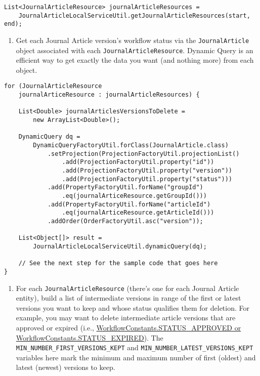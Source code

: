 \begin{enumerate}
\begin{verbatim}
List<JournalArticleResource> journalArticleResources = 
    JournalArticleLocalServiceUtil.getJournalArticleResources(start, end);
\end{verbatim}

  \begin{enumerate}
  \def\labelenumii{\arabic{enumii}.}
  \setcounter{enumii}{1}
  \item
    Get each Journal Article version's workflow status via the
    \texttt{JournalArticle} object associated with each
    \texttt{JournalArticleResource}. Dynamic Query is an efficient way
    to get exactly the data you want (and nothing more) from each
    object.
  \end{enumerate}

\begin{verbatim}
for (JournalArticleResource
    journalArticeResource : journalArticleResources) {

    List<Double> journalArticlesVersionsToDelete =
        new ArrayList<Double>();

    DynamicQuery dq =
        DynamicQueryFactoryUtil.forClass(JournalArticle.class)
            .setProjection(ProjectionFactoryUtil.projectionList()
                .add(ProjectionFactoryUtil.property("id"))
                .add(ProjectionFactoryUtil.property("version"))
                .add(ProjectionFactoryUtil.property("status")))
            .add(PropertyFactoryUtil.forName("groupId")
                .eq(journalArticeResource.getGroupId()))
            .add(PropertyFactoryUtil.forName("articleId")
                .eq(journalArticeResource.getArticleId()))
            .addOrder(OrderFactoryUtil.asc("version"));

    List<Object[]> result =
        JournalArticleLocalServiceUtil.dynamicQuery(dq);

    // See the next step for the sample code that goes here
}
\end{verbatim}

  \begin{enumerate}
  \def\labelenumii{\arabic{enumii}.}
  \setcounter{enumii}{2}
  \tightlist
  \item
    For each \texttt{JournalArticleResource} (there's one for each
    Journal Article entity), build a list of intermediate versions in
    range of the first or latest versions you want to keep and whose
    status qualifies them for deletion. For example, you may want to
    delete intermediate article versions that are approved or expired
    (i.e.,
    \href{@platform-ref@/7.2-latest/javadocs/portal-kernel/com/liferay/portal/kernel/workflow/WorkflowConstants.html}{WorkflowConstants.STATUS\_APPROVED
    or WorkflowConstants.STATUS\_EXPIRED}). The
    \texttt{MIN\_NUMBER\_FIRST\_VERSIONS\_KEPT} and
    \texttt{MIN\_NUMBER\_LATEST\_VERSIONS\_KEPT} variables here mark the
    minimum and maximum number of first (oldest) and latest (newest)
    versions to keep.
  \end{enumerate}


\end{enumerate}
